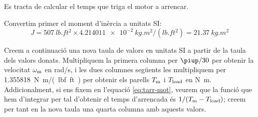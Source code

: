 \begin{exemple}
 Es tracta de calcular el temps que triga el motor a arrencar.

Convertim primer el moment d'inèrcia a unitats SI:
\[
    J =  \qty{507}{lb.ft^2} \times \qty{4,214011e-2}{kg.m^2/(lb.ft^2)}
    = \qty{21,37}{kg.m^2}
\]

Creem a continuació una nova taula de valors en unitats SI a partir de la taula dels valors donats. Multipliquem la primera columna per $\piup/30$ per obtenir la velocitat $\omega_\mathrm{m}$ en \unit{rad/s}, i les dues columnes següents les multipliquem per \qty{1,355818}{N.m/(lbf.ft)} per obtenir els parells $T_\mathrm{m}$ i $T_\mathrm{load}$ en \unit{N.m}. Addicionalment, si ens fixem en l'equació \eqref{eq:tarr-mot}, veurem que la funció que hem d'integrar per tal d'obtenir el temps d'arrencada és $1/(T_\mathrm{m}-T_\mathrm{load})$; creem per tant en la nova taula una quarta columna amb aquests valors.


\end{exemple}
